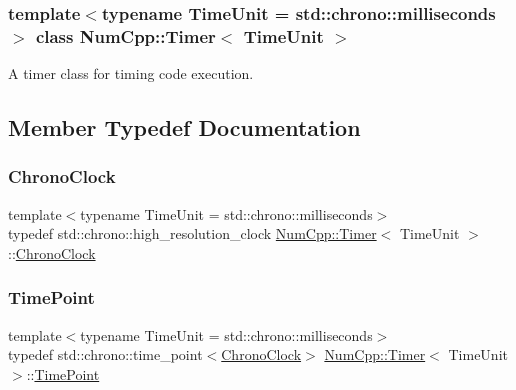 \subsubsection*{template$<$typename Time\+Unit = std\+::chrono\+::milliseconds$>$\newline
class Num\+Cpp\+::\+Timer$<$ Time\+Unit $>$}

A timer class for timing code execution. 

\subsection{Member Typedef Documentation}
\mbox{\label{class_num_cpp_1_1_timer_aa3bbbc8ee01812af652336ea2b7a1fe2}} 
\subsubsection{\texorpdfstring{Chrono\+Clock}{ChronoClock}}
{\footnotesize\ttfamily template$<$typename Time\+Unit  = std\+::chrono\+::milliseconds$>$ \\
typedef std\+::chrono\+::high\+\_\+resolution\+\_\+clock \mbox{\hyperlink{class_num_cpp_1_1_timer}{Num\+Cpp\+::\+Timer}}$<$ Time\+Unit $>$\+::\mbox{\hyperlink{class_num_cpp_1_1_timer_aa3bbbc8ee01812af652336ea2b7a1fe2}{Chrono\+Clock}}}

\mbox{\label{class_num_cpp_1_1_timer_a8539a1471597c9cc517a5043c425bbf5}} 
\subsubsection{\texorpdfstring{Time\+Point}{TimePoint}}
{\footnotesize\ttfamily template$<$typename Time\+Unit  = std\+::chrono\+::milliseconds$>$ \\
typedef std\+::chrono\+::time\+\_\+point$<$\mbox{\hyperlink{class_num_cpp_1_1_timer_aa3bbbc8ee01812af652336ea2b7a1fe2}{Chrono\+Clock}}$>$ \mbox{\hyperlink{class_num_cpp_1_1_timer}{Num\+Cpp\+::\+Timer}}$<$ Time\+Unit $>$\+::\mbox{\hyperlink{class_num_cpp_1_1_timer_a8539a1471597c9cc517a5043c425bbf5}{Time\+Point}}}



